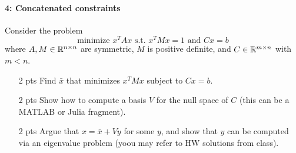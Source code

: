 \documentclass[12pt, leqno]{article} %
\begin{document}
\paragraph*{4: Concatenated constraints}
Consider the problem
\[
  \mbox{minimize } x^T A x \mbox{ s.t. } x^T M x = 1 \mbox{ and } Cx = b
\]
where $A, M \in \mathbb{R}^{n \times n}$ are symmetric, $M$ is positive definite, and $C \in
\mathbb{R}^{m \times n}$ with $m < n$.
\begin{itemize}
\item[2 pts] Find $\bar{x}$ that minimizes $x^T M x$ subject to $Cx = b$.
\item[2 pts] Show how to compute a basis $V$ for the null space of $C$
  (this can be a MATLAB or Julia fragment).
\item[2 pts] Argue that $x = \bar{x} + Vy$ for some $y$,
  and show that $y$ can be computed via an eigenvalue problem
  (yoou may refer to HW solutions from class).
\end{itemize}
\end{document}

